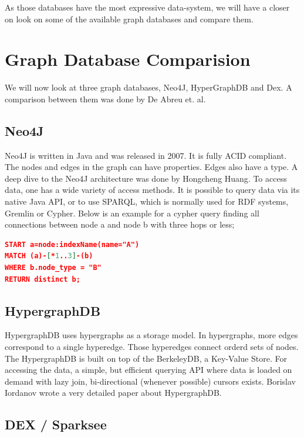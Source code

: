 \documentclass{acm_proc_article-sp}
\begin{document}
As those databases have the most expressive data-system, we will have a closer on look on some of the available graph databases and compare them.

\section{Graph Database Comparision}

We will now look at three graph databases, Neo4J, HyperGraphDB and Dex. A comparison between them was done by De Abreu et. al\cite{comparision}.

\subsection{Neo4J}

Neo4J is written in Java and was released in 2007. It is fully ACID compliant. The nodes and edges in the graph can have properties. Edges also have a type. A deep dive to the Neo4J architecture was done by Hongcheng Huang\cite{n4j}. To access data, one has a wide variety of access methods. It is possible to query data via its native Java API, or to use SPARQL, which is normally used for RDF systems, Gremlin or Cypher. Below is an example for a cypher query finding all connections between node a and node b with three hops or less;

\begin{lstlisting}[language=json,firstnumber=1]
START a=node:indexName(name="A")
MATCH (a)-[*1..3]-(b)
WHERE b.node_type = "B"
RETURN distinct b;
\end{lstlisting}

\subsection{HypergraphDB}

HypergraphDB uses hypergraphs as a storage model. In hypergraphs, more edges correspond to a single hyperedge. Those hyperedges connect orderd sets of nodes. The HypergraphDB is built on top of the BerkeleyDB, a Key-Value Store. For accessing the data, a simple, but efficient querying API where data is loaded on demand with lazy join, bi-directional (whenever possible) cursors exists. Borislav Iordanov wrote a very detailed paper about HypergraphDB\cite{hyper}.

\subsection{DEX / Sparksee}
\end{document}
